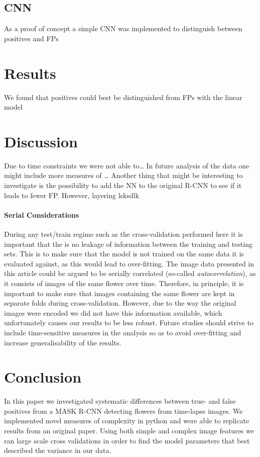 \documentclass[12pt]{article}
\begin{document}
\subsection{CNN}
As a proof of concept a simple CNN was implemented to distinguish between positives and FPs


\section{Results}
We found that positives could best be distinguished from FPs with the linear model 


\section{Discussion}
Due to time constraints we were not able to\dots
In future analysis of the data one might include more measures of \dots
Another thing that might be interesting to investigate is the possibility to add the NN to the original R-CNN to see if it leads to fewer FP. However, layering lsksdlk

\paragraph{Serial Considerations}
During any test/train regime such as the cross-validation performed here it is important that the is no leakage of information between the training and testing sets. This is to make sure that the model is not trained on the same data it is evaluated against, as this would lead to over-fitting. The image data presented in this article could be argued to be serially correlated (so-called \textit{autocorrelation}), as it consists of images of the same flower over time. Therefore, in principle, it is important to make sure that images containing the same flower are kept in separate folds during cross-validation. However, due to the way the original images were encoded we did not have this information available, which unfortunately causes our results to be less robust. Future studies should strive to include time-sensitive measures in the analysis so as to avoid over-fitting and increase generalisability of the results.

\section{Conclusion}
In this paper we investigated systematic differences between true- and false positives from a MASK R-CNN detecting flowers from time-lapse images. We implemented novel measures of complexity in python and were able to replicate results from an original paper. Using both simple and complex image features we ran large scale cross validations in order to find the model parameters that best described the variance in our data. 
\end{document}
